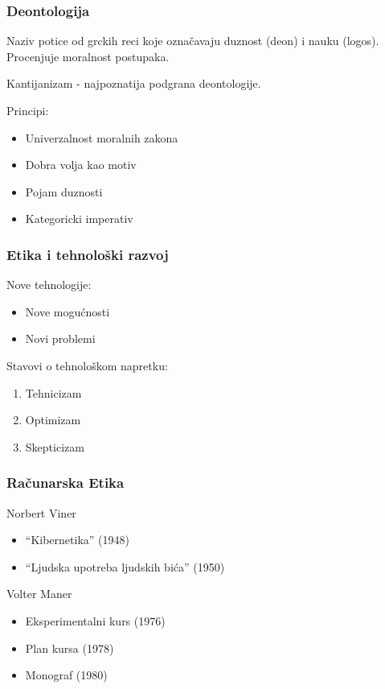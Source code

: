 \documentclass[pdf]{beamer}
\begin{document}
\begin{frame}
\frametitle{Deontologija}

Naziv potice od grckih reci koje označavaju duznost (deon) i nauku (logos). Procenjuje moralnost postupaka.


Kantijanizam - najpoznatija podgrana deontologije.

Principi:
\begin{itemize}
\item{Univerzalnost moralnih zakona}
\item{Dobra volja kao motiv}
\item{Pojam duznosti}
\item{Kategoricki imperativ}
\end{itemize}

\end{frame}


\begin{frame}
\frametitle{Etika i tehnološki razvoj}

	Nove tehnologije:

	\begin{itemize}

	\item Nove mogućnosti

	\item Novi problemi

	\end{itemize}

	Stavovi o tehnološkom napretku:

	\begin{enumerate}

	\item Tehnicizam
	\item Optimizam
	\item Skepticizam

	\end{enumerate}

	\end{frame}


\begin{frame}
\frametitle{Računarska Etika}
	
	Norbert Viner
	\begin{itemize}
	\item ``Kibernetika'' (1948) %
	\item ``Ljudska upotreba ljudskih bića'' (1950)
	\end{itemize}
	
	Volter Maner
	\begin{itemize}
	\item Eksperimentalni kurs (1976)
	\item Plan kursa (1978)	
	\item Monograf (1980) %
	\end{itemize}
	\end{frame}
\end{document}
